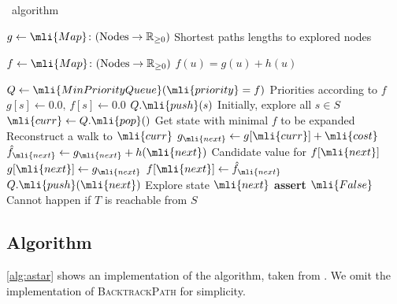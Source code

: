 \begin{algorithm}[H]
	\caption{\A~algorithm}\label{alg:astar}
	\begin{algorithmic}[1]
		\State $g \gets \mli{Map}\colon (\text{Nodes} \to \mathbb{R}_{\geq 0})$
		\Comment Shortest paths lengths to explored nodes

		\State $f \gets \mli{Map}\colon (\text{Nodes} \to \mathbb{R}_{\geq 0})$
		\Comment $f(u)=g(u)+h(u)$ 

		\State $Q \gets \mli{MinPriorityQueue}(\mli{priority}=f)$ 
		\Comment Priorities according to $f$
			\State $g[s] \gets 0.0,\, f[s] \gets 0.0$
			\State $Q.\mli{push}(s)$
			\Comment Initially, explore all $s \in S$
		\EndFor
			\State $\mli{curr} \gets Q.\mli{pop}()$
			\Comment Get state with minimal $f$ to be expanded
				\State \Return {}
				\Comment Reconstruct a walk to $\mli{curr}$
			\EndIf
			\State $g_\mli{next} \gets g[\mli{curr}] + \mli{cost}$
			\State $\hat{f}_\mli{next} \gets g_\mli{next} + h(\mli{next})$
				\Comment Candidate value for $f[\mli{next}]$
					\State $g[\mli{next}] \gets g_\mli{next}$		
					\State $f[\mli{next}] \gets \hat{f}_\mli{next}$		
					\State $Q.\mli{push}(\mli{next})$
					\Comment Explore state $\mli{next}$
				\EndIf
		\EndFor
		\EndWhile
		\State \textbf{assert} $\mli{False}$
		\Comment Cannot happen if $T$ is reachable from $S$
		\EndFunction

	\end{algorithmic}
\end{algorithm}

\subsection{\A Algorithm} \label{app:astar}
%
\cref{alg:astar} shows an implementation of the \A algorithm, taken from
\citet{ivanov2020astarix}.
%
We omit the implementation of \textsc{BacktrackPath} for simplicity.
